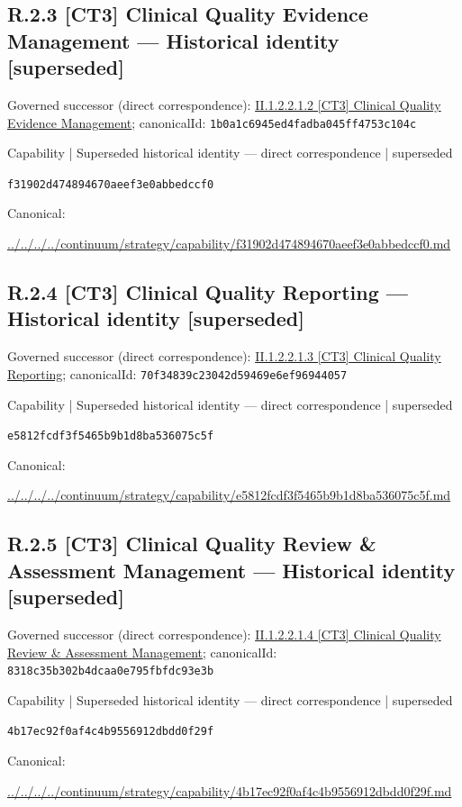 \documentclass[10pt,a4paper]{article}
\begin{document}
\subsection*{R.2.3 [CT3] Clinical Quality Evidence Management — Historical identity [superseded]}
Governed successor (direct correspondence): \hyperref[element-1b0a1c6945ed4fadba045ff4753c104c]{II.1.2.2.1.2 [CT3] Clinical Quality Evidence Management}; canonicalId: \texttt{1b0a1c6945ed4fadba045ff4753c104c}\par
\label{element-f31902d474894670aeef3e0abbedccf0}
{\small Capability | Superseded historical identity — direct correspondence | superseded}\par
\texttt{f31902d474894670aeef3e0abbedccf0}\par
Canonical: \par
{\footnotesize\url{../../../../continuum/strategy/capability/f31902d474894670aeef3e0abbedccf0.md}}\par
\subsection*{R.2.4 [CT3] Clinical Quality Reporting — Historical identity [superseded]}
Governed successor (direct correspondence): \hyperref[element-70f34839c23042d59469e6ef96944057]{II.1.2.2.1.3 [CT3] Clinical Quality Reporting}; canonicalId: \texttt{70f34839c23042d59469e6ef96944057}\par
\label{element-e5812fcdf3f5465b9b1d8ba536075c5f}
{\small Capability | Superseded historical identity — direct correspondence | superseded}\par
\texttt{e5812fcdf3f5465b9b1d8ba536075c5f}\par
Canonical: \par
{\footnotesize\url{../../../../continuum/strategy/capability/e5812fcdf3f5465b9b1d8ba536075c5f.md}}\par
\subsection*{R.2.5 [CT3] Clinical Quality Review \& Assessment Management — Historical identity [superseded]}
Governed successor (direct correspondence): \hyperref[element-8318c35b302b4dcaa0e795fbfdc93e3b]{II.1.2.2.1.4 [CT3] Clinical Quality Review \& Assessment Management}; canonicalId: \texttt{8318c35b302b4dcaa0e795fbfdc93e3b}\par
\label{element-4b17ec92f0af4c4b9556912dbdd0f29f}
{\small Capability | Superseded historical identity — direct correspondence | superseded}\par
\texttt{4b17ec92f0af4c4b9556912dbdd0f29f}\par
Canonical: \par
{\footnotesize\url{../../../../continuum/strategy/capability/4b17ec92f0af4c4b9556912dbdd0f29f.md}}\par
\end{document}
